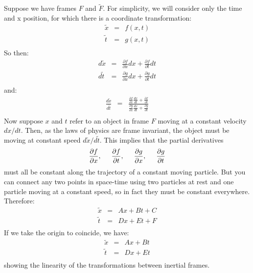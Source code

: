 \documentclass[12pt]{book}
\begin{document}
Suppose we have frames $F$ and $\widetilde{F}$.  For simplicity, we will consider only the time and x position, for which there is a coordinate transformation:
\begin{eqnarray*}
\widetilde{x} &=& f(x,t)\\
\widetilde{t} &=& g(x,t)\\
\end{eqnarray*}
So then:
\begin{eqnarray*}
d\widetilde{x} &=& \frac{\partial f}{\partial x}dx + \frac{\partial f}{\partial t}dt \\
d\widetilde{t} &=& \frac{\partial g}{\partial x}dx + \frac{\partial g}{\partial t}dt \\
\end{eqnarray*}
and:
\begin{eqnarray*}
\frac{d\widetilde{x}}{d\widetilde{t}} &=& 
\frac{\displaystyle \frac{\partial f}{\partial x}\frac{dx}{dt} + \frac{\partial f}{\partial t}}
{\displaystyle \frac{\partial g}{\partial x}\frac{dx}{dt} + \frac{\partial g}{\partial t}}\\
\end{eqnarray*}
Now suppose $x$ and $t$ refer to an object in frame $F$ moving at a constant velocity $dx/dt$.  Then, as the laws of physics are frame invariant, the object must be moving at constant speed $d\widetilde{x}/d\widetilde{t}$.  This implies that the partial derivatives $$\frac{\partial f}{\partial x}, \hspace{0.5cm}\frac{\partial f}{\partial t},  \hspace{0.5cm}\frac{\partial g}{\partial x},  \hspace{0.5cm}\frac{\partial g}{\partial t}$$
must all be constant along the trajectory of a constant moving particle.  But you can connect any two points in space-time using two particles at rest and one particle moving at a constant speed, so in fact they must be constant everywhere. 
Therefore:
\begin{eqnarray*}
\widetilde{x} &=& A x + B t + C \\
\widetilde{t} &=& D x + E t + F \\
\end{eqnarray*}
If we take the origin to coincide, we have:
\begin{eqnarray*}
\widetilde{x} &=& A x + B t\\
\widetilde{t} &=& D x + E t\\
\end{eqnarray*}
showing the linearity of the transformations between inertial frames.
\end{document}
